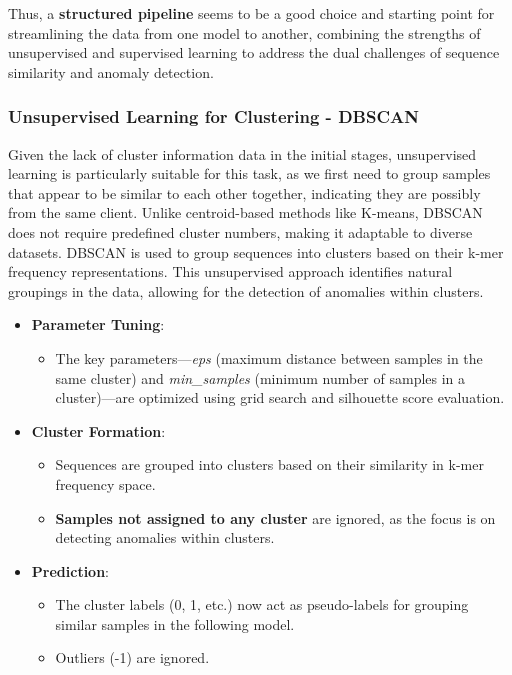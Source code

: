 Thus, a \textbf{structured pipeline} seems to be a good choice and starting point for streamlining the data from one model to another, combining the strengths of unsupervised and supervised learning to address the dual challenges of sequence similarity and anomaly detection.

\subsubsection{Unsupervised Learning for Clustering - DBSCAN}
Given the lack of cluster information data in the initial stages, unsupervised learning is particularly suitable for this task, as we first need to group samples that appear to be similar to each other together, indicating they are possibly from the same client. 
Unlike centroid-based methods like K-means, DBSCAN does not require predefined cluster numbers, making it adaptable to diverse datasets.
DBSCAN is used to group sequences into clusters based on their k-mer frequency representations. This unsupervised approach identifies natural groupings in the data, allowing for the detection of anomalies within clusters.

\begin{itemize}
    \item \textbf{Parameter Tuning}:
    \begin{itemize}
        \item The key parameters—\textit{eps} (maximum distance between samples in the same cluster) and \textit{min\_samples} (minimum number of samples in a cluster)—are optimized using grid search and silhouette score evaluation.
    \end{itemize}

    \item \textbf{Cluster Formation}:
    \begin{itemize}
        \item Sequences are grouped into clusters based on their similarity in k-mer frequency space.
        \item \textbf{Samples not assigned to any cluster} are ignored, as the focus is on detecting anomalies within clusters.
    \end{itemize}

    \item \textbf{Prediction}:
    \begin{itemize}
        \item The cluster labels (0, 1, etc.) now act as pseudo-labels for grouping similar samples in the following model.
        \item Outliers (-1) are ignored.
    \end{itemize}
\end{itemize}

